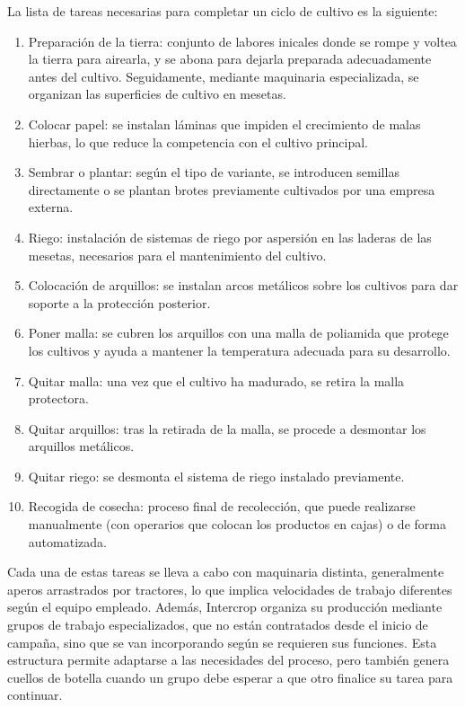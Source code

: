 La lista de tareas necesarias para completar un ciclo de cultivo es la siguiente:
\begin{enumerate}
    \item Preparación de la tierra: conjunto de labores inicales donde se rompe y voltea la tierra para airearla, y se abona para dejarla preparada adecuadamente antes del cultivo.
          Seguidamente, mediante maquinaria especializada, se organizan las superficies de cultivo en mesetas.
    \item Colocar papel: se instalan láminas que impiden el crecimiento de malas hierbas, lo que reduce la competencia con el cultivo principal.
    \item Sembrar o plantar: según el tipo de variante, se introducen semillas directamente o se plantan brotes previamente cultivados por una empresa externa.
    \item Riego: instalación de sistemas de riego por aspersión en las laderas de las mesetas, necesarios para el mantenimiento del cultivo.
    \item Colocación de arquillos: se instalan arcos metálicos sobre los cultivos para dar soporte a la protección posterior.
    \item Poner malla: se cubren los arquillos con una malla de poliamida que protege los cultivos y ayuda a mantener la temperatura adecuada para su desarrollo.
    \item Quitar malla: una vez que el cultivo ha madurado, se retira la malla protectora.
    \item Quitar arquillos: tras la retirada de la malla, se procede a desmontar los arquillos metálicos.
    \item Quitar riego: se desmonta el sistema de riego instalado previamente.
    \item Recogida de cosecha: proceso final de recolección, que puede realizarse manualmente (con operarios que colocan los productos en cajas) o de forma automatizada.
\end{enumerate}

Cada una de estas tareas se lleva a cabo con maquinaria distinta, generalmente aperos arrastrados por tractores, lo que implica velocidades de trabajo diferentes según el equipo empleado.
Además, Intercrop organiza su producción mediante grupos de trabajo especializados, que no están contratados desde el inicio de campaña, sino que se van incorporando según se requieren sus funciones.
Esta estructura permite adaptarse a las necesidades del proceso, pero también genera cuellos de botella cuando un grupo debe esperar a que otro finalice su tarea para continuar.

